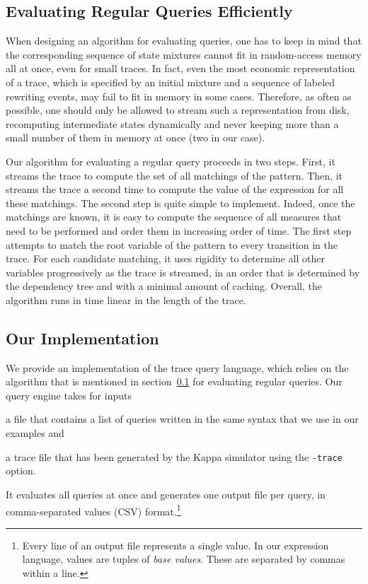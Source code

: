 \documentclass[runningheads]{llncs}
\begin{document}

\subsection{Evaluating Regular Queries
  Efficiently}\label{subsec:evalq}

When designing an algorithm for evaluating queries, one has to keep in
mind that the corresponding sequence of state mixtures cannot fit in
random-access memory all at once, even for small traces. In fact, even
the most economic representation of a trace, which is specified by an
initial mixture and a sequence of labeled rewriting events, may fail
to fit in memory in some cases. Therefore, as often as possible, one
should only be allowed to stream such a representation from disk,
recomputing intermediate states dynamically and never keeping more
than a small number of them in memory at once (two in our case).

Our algorithm for evaluating a regular query proceeds in two
steps. First, it streams the trace to compute the set of all matchings
of the pattern. Then, it streams the trace a second time to compute
the value of the expression for all these matchings. The second step
is quite simple to implement. Indeed, once the matchings are known, it
is easy to compute the sequence of all measures that need to be
performed and order them in increasing order of time. The first step
attempts to match the root variable of the pattern to every transition
in the trace. For each candidate matching, it uses rigidity to
determine all other variables progressively as the trace is streamed,
in an order that is determined by the dependency tree and with a
minimal amount of caching. Overall, the algorithm runs in time linear
in the length of the trace.


\subsection{Our Implementation}

We provide an implementation of the trace query language, which relies
on the algorithm that is mentioned in section~\ref{subsec:evalq} for
evaluating regular queries. Our query engine takes for inputs
\begin{inparaenum}[(i)]
\item a file that contains a list of queries written in the same
  syntax that we use in our examples and
\item a trace file that has been generated by the Kappa simulator
  using the \texttt{-trace} option.
\end{inparaenum}
It evaluates all queries at once and generates one output file per
query, in comma-separated values (CSV) format.\footnote{Every line of
  an output file represents a single value. In our expression
  language, values are tuples of \emph{base values}. These are
  separated by commas within a line.}
\end{document}

